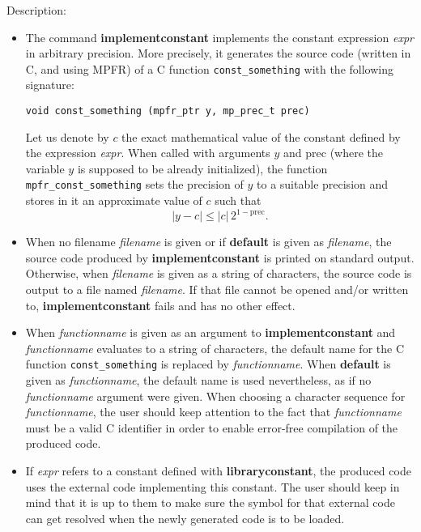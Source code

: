 \noindent Description: \begin{itemize}

\item The command \textbf{implementconstant} implements the constant expression \emph{expr} in 
   arbitrary precision. More precisely, it generates the source code (written
   in C, and using MPFR) of a C function \texttt{const\_something} with the following
   signature:
   \begin{center}
   \texttt{void const\_something (mpfr\_ptr y, mp\_prec\_t prec)}
   \end{center}
   Let us denote by $c$ the exact mathematical value of the constant defined by
   the expression \emph{expr}. When called with arguments $y$ and prec (where the
   variable $y$ is supposed to be already initialized), the function
   \texttt{mpfr\_const\_something} sets the precision of $y$ to a suitable precision and
   stores in it an approximate value of $c$ such that
   $$|y-c| \le |c|\,2^{1-\mathrm{prec}}.$$

\item When no filename \emph{filename} is given or if \textbf{default} is given as
   \emph{filename}, the source code produced by \textbf{implementconstant} is printed on
   standard output. Otherwise, when \emph{filename} is given as a 
   string of characters, the source code is output to a file 
   named \emph{filename}. If that file cannot be opened and/or 
   written to, \textbf{implementconstant} fails and has no other effect.

\item When \emph{functionname} is given as an argument to \textbf{implementconstant} and
   \emph{functionname} evaluates to a string of characters, the default name
   for the C function \texttt{const\_something} is
   replaced by \emph{functionname}. When \textbf{default} is given as \emph{functionname},
   the default name is used nevertheless, as if no \emph{functionname}
   argument were given.  When choosing a character sequence for
   \emph{functionname}, the user should keep attention to the fact that
   \emph{functionname} must be a valid C identifier in order to enable
   error-free compilation of the produced code.

\item If \emph{expr} refers to a constant defined with \textbf{libraryconstant}, the produced
   code uses the external code implementing this constant. The user should
   keep in mind that it is up to them to make sure the symbol for that 
   external code can get resolved when the newly generated code is to 
   be loaded.


\end{itemize}
